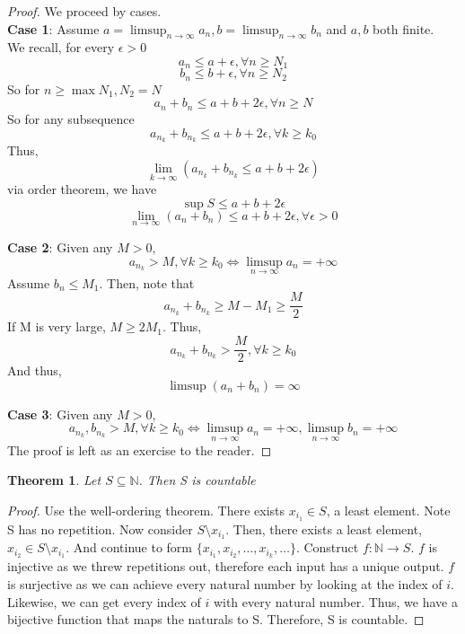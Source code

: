 \documentclass[12pt,reqno]{amsart}
\theoremstyle{plain}
\newtheorem*{theorem}{Theorem}
\begin{document}
    \begin{proof}
        We proceed by cases. \\
        \textbf{Case 1}: Assume $a = \limsup_{n\to\infty}a_n, b = \limsup_{n\to\infty}b_n$ and $a,b$ both finite. \\
            We recall, for every $\epsilon > 0$
            \[a_n \le a + \epsilon, \forall n \ge N_1 \]
            \[b_n \le b + \epsilon, \forall n \ge N_2 \]
            So for $n \ge \max{N_1, N_2} = N$
            \[ a_n + b_n \le a + b + 2\epsilon, \forall n \ge N \]
            So for any subsequence
            \[ a_{n_k} + b_{n_k} \le a + b + 2\epsilon, \forall k \ge k_0 \]
            Thus,
            \[ \lim_{k \to \infty} (a_{n_k} + b_{n_k} \le a + b + 2\epsilon)\]
            via order theorem, we have
            \[\sup S \le a + b + 2\epsilon \]
            \[\lim_{n \to \infty} (a_n + b_n) \le a + b + 2\epsilon, \forall \epsilon > 0 \]

        \textbf{Case 2}: Given any $ M > 0 $,
            \[ a_{n_k} > M, \forall k \ge k_0 \iff \limsup_{n\to\infty} a_n = +\infty\]
            Assume $b_n \le M_1$. Then, note that
            \[ a_{n_k} + b_{n_k} \ge M - M_1 \ge \frac M 2 \]
            If M is very large, $M \ge 2M_1$. Thus,
            \[ a_{n_k} + b_{n_k} > \frac M 2, \forall k \ge k_0 \]
            And thus,
            \[ \limsup (a_n + b_n) = \infty \]
        
        \textbf{Case 3}: Given any $ M > 0 $,
            \[ a_{n_k},b_{n_k} > M, \forall k \ge k_0 \iff \limsup_{n\to\infty} a_n = +\infty, \limsup_{n\to\infty} b_n = +\infty\]
            The proof is left as an exercise to the reader.

    \end{proof}

    \begin{theorem}
        Let $S \subseteq \mathbb{N}$. Then S is countable
    \end{theorem}

    \begin{proof}
        Use the well-ordering theorem. There exists $x_{i_1} \in S$, a least element. Note S has no repetition.
        Now consider $S \setminus {x_{i_1}}$.
        Then, there exists a least element, $x_{i_2} \in S \setminus {x_{i_1}}$.
        And continue to form $\{{x_{i_1}}, {x_{i_2}}, \dots, {x_{i_k}}, \dots\}$.
        Construct $f:\mathbb{N} \to S$. 
        $f$ is injective as we threw repetitions out, therefore each input has a unique output.
        $f$ is surjective as we can achieve every natural number by looking at the index  of $i$. 
        Likewise, we can get every index of $i$ with every natural number.
        Thus, we have a bijective function that maps the naturals to S. Therefore, S is countable.

    \end{proof}
\end{document}
